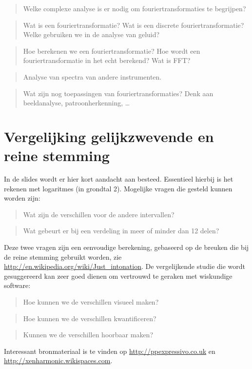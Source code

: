 \documentclass[10pt,a4paper]{article}
\begin{document}
\begin{quote}
  Welke complexe analyse is er nodig om fouriertransformaties te begrijpen?
\end{quote}
\begin{quote}
  Wat is een fouriertransformatie? Wat is een discrete fouriertransformatie? Welke gebruiken we in de analyse van geluid?
\end{quote}
\begin{quote}
  Hoe berekenen we een fouriertransformatie? Hoe wordt een fouriertransformatie in het echt berekend? Wat is FFT?
\end{quote}
\begin{quote}
 Analyse van spectra van andere instrumenten.
\end{quote}
\begin{quote}
  Wat zijn nog toepassingen van fouriertransformaties? Denk aan beeldanalyse, patroonherkenning, \dots
\end{quote}


\section{Vergelijking gelijkzwevende en reine stemming}
In de slides wordt er hier kort aandacht aan besteed. Essentieel hierbij is het rekenen met logaritmes (in grondtal 2). Mogelijke vragen die gesteld kunnen worden zijn:
\begin{quote}
  Wat zijn de verschillen voor de andere intervallen?
\end{quote}
\begin{quote}
  Wat gebeurt er bij een verdeling in meer of minder dan 12 delen?
\end{quote}
Deze twee vragen zijn een eenvoudige berekening, gebaseerd op de breuken die bij de reine stemming gebruikt worden, zie \url{http://en.wikipedia.org/wiki/Just_intonation}. De vergelijkende studie die wordt gesuggereerd kan zeer goed dienen om vertrouwd te geraken met wiskundige software:
\begin{quote}
  Hoe kunnen we de verschillen visueel maken?
\end{quote}
\begin{quote}
  Hoe kunnen we de verschillen kwantificeren?
\end{quote}
\begin{quote}
  Kunnen we de verschillen hoorbaar maken?
\end{quote}
Interessant bronmateriaal is te vinden op \url{http://ppexpressivo.co.uk} en \url{http://xenharmonic.wikispaces.com}.
\end{document}
